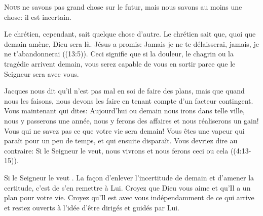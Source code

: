 


\lettrine{N}{ous} ne savons pas grand chose sur le futur,
 mais nous savons au moins une chose: il est incertain. 

Le chrétien, cependant, sait quelque chose d'autre.
 Le chrétien sait que, quoi que demain amène, Dieu sera là.
 Jésus a promis:
 \Og Jamais je ne te délaisserai, jamais, je ne t'abandonnerai \Fg{}
 ((13:5)).
 Ceci signifie que si la douleur, le chagrin ou la tragédie arrivent 
 demain, vous serez capable de vous en sortir
 parce que le Seigneur sera avec vous. 


Jacques nous dit qu'il n'est pas mal en soi de faire des plans,
 mais que quand nous les faisons, nous devons les faire en tenant compte
 d'un facteur contingent.
 \Og Vous maintenant qui dites: Aujourd'hui ou demain nous irons
 dans telle ville, nous y passerons une année, nous y ferons des affaires
 et nous réaliserons un gain! Vous qui ne savez pas ce que votre vie
 sera demain! Vous êtes une vapeur qui paraît pour un peu de temps,
 et qui ensuite disparaît.
 Vous devriez dire au contraire: Si le Seigneur le veut,
 nous vivrons et nous ferons ceci ou cela \Fg{} ((4:13-15)). 

\Og Si le Seigneur le veut \Fg{}. La fa\c{c}on d'enlever l'incertitude de demain
 et d'amener la certitude, c'est de s'en remettre à Lui.
 Croyez que Dieu vous aime et qu'Il a un plan pour votre vie.
 Croyez qu'Il est avec vous indépendamment de ce qui arrive
 \ocadr et restez ouverts à l'idée d'être dirigés et guidés par Lui.

\dvrule






